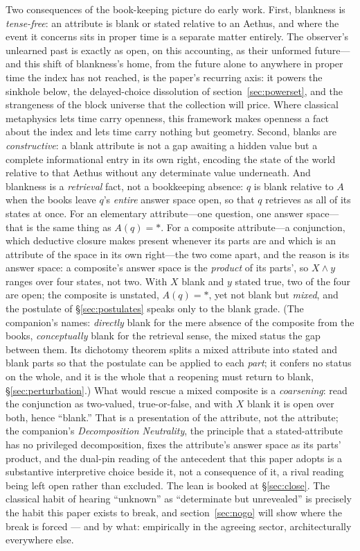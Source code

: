 \documentclass[11pt]{article}
\theoremstyle{definition}
\newcommand{\Aethus}{Aethus}
\begin{document}
Two consequences of the book-keeping picture do early work. First, blankness is \emph{tense-free}: an attribute is blank or stated relative to an \Aethus, and where the event it concerns sits in proper time is a separate matter entirely. The observer's unlearned past is exactly as open, on this accounting, as their unformed future---and this shift of blankness's home, from the future alone to anywhere in proper time the index has not reached, is the paper's recurring axis: it powers the sinkhole below, the delayed-choice dissolution of section~\ref{sec:powerset}, and the strangeness of the block universe that the collection will price. Where classical metaphysics lets time carry openness, this framework makes openness a fact about the index and lets time carry nothing but geometry. Second, blanks are \emph{constructive}: a blank attribute is not a gap awaiting a hidden value but a complete informational entry in its own right, encoding the state of the world relative to that \Aethus{} without any determinate value underneath. And blankness is a \emph{retrieval} fact, not a bookkeeping absence: $q$ is blank relative to $A$ when the books leave $q$'s \emph{entire} answer space open, so that $q$ retrieves as all of its states at once. For an elementary attribute---one question, one answer space---that is the same thing as $A(q)=\ast$. For a composite attribute---a conjunction, which deductive closure makes present whenever its parts are and which is an attribute of the space in its own right---the two come apart, and the reason is its answer space: a composite's answer space is the \emph{product} of its parts', so $X \wedge y$ ranges over four states, not two. With $X$ blank and $y$ stated true, two of the four are open; the composite is unstated, $A(q)=\ast$, yet not blank but \emph{mixed}, and the postulate of \S\ref{sec:postulates} speaks only to the blank grade. (The companion's names: \emph{directly} blank for the mere absence of the composite from the books, \emph{conceptually} blank for the retrieval sense, the mixed status the gap between them. Its dichotomy theorem splits a mixed attribute into stated and blank parts so that the postulate can be applied to each \emph{part}; it confers no status on the whole, and it is the whole that a reopening must return to blank, \S\ref{sec:perturbation}.) What would rescue a mixed composite is a \emph{coarsening}: read the conjunction as two-valued, true-or-false, and with $X$ blank it is open over both, hence ``blank.'' That is a presentation of the attribute, not the attribute; the companion's \emph{Decomposition Neutrality}, the principle that a stated-attribute has no privileged decomposition, fixes the attribute's answer space as its parts' product, and the dual-pin reading of the antecedent that this paper adopts is a substantive interpretive choice beside it, not a consequence of it, a rival reading being left open rather than excluded. The lean is booked at \S\ref{sec:close}. The classical habit of hearing ``unknown'' as ``determinate but unrevealed'' is precisely the habit this paper exists to break, and section~\ref{sec:nogo} will show where the break is forced --- and by what: empirically in the agreeing sector, architecturally everywhere else.
\end{document}
